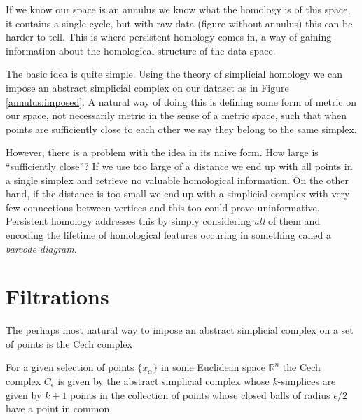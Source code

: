 If we know our space is an annulus we know what the homology is of this space, it contains a single cycle, but with raw data (figure without annulus) this can be harder to tell. This is where persistent homology comes in, a way of gaining information about the homological structure of the data space.

The basic idea is quite simple. Using the theory of simplicial homology we can impose an abstract simplicial complex on our dataset as in Figure \ref{annulus:imposed}. A natural way of doing this is defining some form of metric on our space, not necessarily metric in the sense of a metric space, such that when points are sufficiently close to each other we say they belong to the same simplex.

However, there is a problem with the idea in its naive form. How large is ``sufficiently close''? If we use too large of a distance we end up with all points in a single simplex and retrieve no valuable homological information. On the other hand, if the distance is too small we end up with a simplicial complex with very few connections between vertices and this too could prove uninformative. Persistent homology addresses this by simply considering \textit{all} of them and encoding the lifetime of homological features occuring in something called a \textit{barcode diagram}.





\section{Filtrations}
The perhaps most natural way to impose an abstract simplicial complex on a set of points is the Cech complex
\begin{definition}
For a given selection of points $\{x_{\alpha}\}$ in some Euclidean space $\mathbb{R}^{n}$ the Cech complex $C_{\epsilon}$ is given by the abstract simplicial complex whose $k$-simplices are given by $k+1$ points in the collection of points whose closed balls of radius $\epsilon/2$ have a point in common.
\end{definition}

